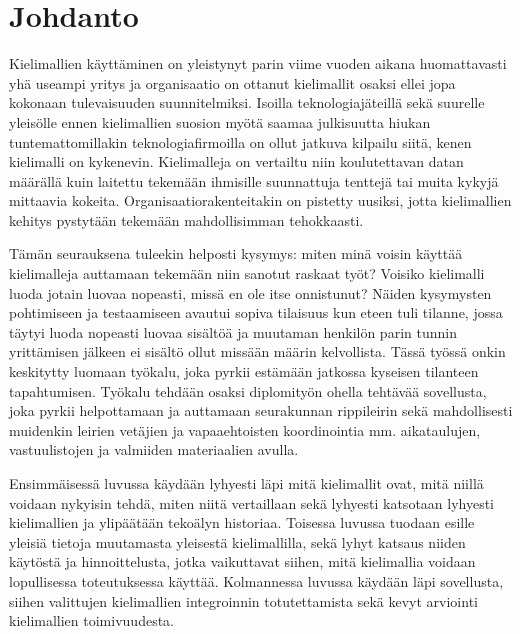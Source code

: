 \chapter{Johdanto}
\label{ch:johdanto}

Kielimallien käyttäminen on yleistynyt parin viime vuoden aikana huomattavasti
yhä useampi yritys ja organisaatio on ottanut kielimallit osaksi ellei jopa
kokonaan tulevaisuuden suunnitelmiksi. Isoilla teknologiajäteillä sekä suurelle
yleisölle ennen kielimallien suosion myötä saamaa julkisuutta hiukan
tuntemattomillakin teknologiafirmoilla on ollut jatkuva kilpailu siitä, kenen
kielimalli on kykenevin. Kielimalleja on vertailtu niin koulutettavan datan
määrällä kuin laitettu tekemään ihmisille suunnattuja tenttejä tai muita kykyjä
mittaavia kokeita. Organisaatiorakenteitakin on pistetty uusiksi, jotta
kielimallien kehitys pystytään tekemään mahdollisimman tehokkaasti.

Tämän seurauksena tuleekin helposti kysymys: miten minä voisin käyttää
kielimalleja auttamaan tekemään niin sanotut raskaat työt? Voisiko kielimalli
luoda jotain luovaa nopeasti, missä en ole itse onnistunut? Näiden kysymysten
pohtimiseen ja testaamiseen avautui sopiva tilaisuus kun eteen tuli tilanne,
jossa täytyi luoda nopeasti luovaa sisältöä ja muutaman henkilön parin tunnin
yrittämisen jälkeen ei sisältö ollut missään määrin kelvollista. Tässä työssä
onkin keskitytty luomaan työkalu, joka pyrkii estämään jatkossa kyseisen
tilanteen tapahtumisen. Työkalu tehdään osaksi diplomityön ohella tehtävää
sovellusta, joka pyrkii helpottamaan ja auttamaan seurakunnan rippileirin sekä
mahdollisesti muidenkin leirien vetäjien ja vapaaehtoisten koordinointia mm.
aikataulujen, vastuulistojen ja valmiiden materiaalien avulla.

Ensimmäisessä luvussa käydään lyhyesti läpi mitä kielimallit ovat, mitä niillä
voidaan nykyisin tehdä, miten niitä vertaillaan sekä lyhyesti katsotaan lyhyesti
kielimallien ja ylipäätään tekoälyn historiaa. Toisessa luvussa tuodaan esille
yleisiä tietoja muutamasta yleisestä kielimallilla, sekä lyhyt katsaus niiden
käytöstä ja hinnoittelusta, jotka vaikuttavat siihen, mitä kielimallia voidaan
lopullisessa toteutuksessa käyttää. Kolmannessa luvussa käydään läpi sovellusta,
siihen valittujen kielimallien integroinnin totutettamista sekä kevyt arviointi
kielimallien toimivuudesta.

